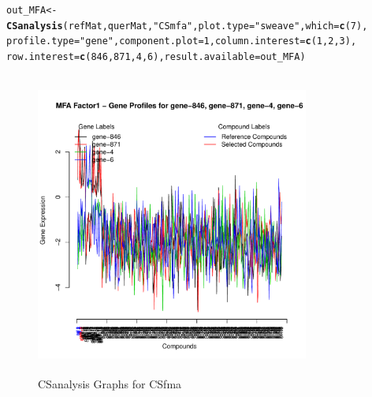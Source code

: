 \documentclass[a4paper]{article}\usepackage[]{graphicx}\usepackage[]{color}
\makeatletter
\newcommand{\hlnum}[1]{\textcolor[rgb]{0.686,0.059,0.569}{#1}}%
\newcommand{\hlstr}[1]{\textcolor[rgb]{0.192,0.494,0.8}{#1}}%
\newcommand{\hlstd}[1]{\textcolor[rgb]{0.345,0.345,0.345}{#1}}%
\newcommand{\hlkwb}[1]{\textcolor[rgb]{0.69,0.353,0.396}{#1}}%
\newcommand{\hlkwc}[1]{\textcolor[rgb]{0.333,0.667,0.333}{#1}}%
\newcommand{\hlkwd}[1]{\textcolor[rgb]{0.737,0.353,0.396}{\textbf{#1}}}%
\newenvironment{kframe}{%
 \def\at@end@of@kframe{}%
 \ifinner\ifhmode%
  \def\at@end@of@kframe{\end{minipage}}%
  \begin{minipage}{\columnwidth}%
 \fi\fi%
 \def\FrameCommand##1{\hskip\@totalleftmargin \hskip-\fboxsep
 \colorbox{shadecolor}{##1}\hskip-\fboxsep
     \hskip-\linewidth \hskip-\@totalleftmargin \hskip\columnwidth}%
 \MakeFramed {\advance\hsize-\width
   \@totalleftmargin\z@ \linewidth\hsize
   \@setminipage}}%
 {\par\unskip\endMakeFramed%
 \at@end@of@kframe}
\newenvironment{knitrout}{}{} %
\makeatother
\begin{document}
\begin{knitrout}
\color{fgcolor}\begin{kframe}
\begin{alltt}
        \hlstd{out_MFA} \hlkwb{<-} \hlkwd{CSanalysis}\hlstd{(refMat,querMat,}\hlstr{"CSmfa"}\hlstd{,}\hlkwc{plot.type}\hlstd{=}\hlstr{"sweave"}\hlstd{,}\hlkwc{which}\hlstd{=}\hlkwd{c}\hlstd{(}\hlnum{7}\hlstd{),}
                        \hlkwc{profile.type}\hlstd{=}\hlstr{"gene"}\hlstd{,}\hlkwc{component.plot}\hlstd{=}\hlnum{1}\hlstd{,}\hlkwc{column.interest}\hlstd{=}\hlkwd{c}\hlstd{(}\hlnum{1}\hlstd{,}\hlnum{2}\hlstd{,}\hlnum{3}\hlstd{),}
                        \hlkwc{row.interest}\hlstd{=}\hlkwd{c}\hlstd{(}\hlnum{846}\hlstd{,}\hlnum{871}\hlstd{,}\hlnum{4}\hlstd{,}\hlnum{6}\hlstd{),}\hlkwc{result.available}\hlstd{=out_MFA)}
\end{alltt}
\end{kframe}\begin{figure}[H]

\includegraphics[width=9cm,height=10cm]{figure/MFA3-1} \hfill{}

\caption[CSanalysis Graphs for CSfma]{CSanalysis Graphs for CSfma}\label{fig:MFA3}
\end{figure}


\end{knitrout}
\end{document}
